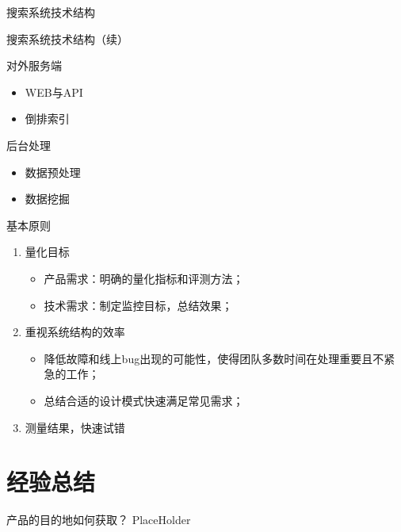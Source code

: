 \documentclass{beamer}
\begin{document}
\begin{CJK}{UTF8}{gbsn}
\begin{frame}{搜索系统技术结构}
\end{frame}

\begin{frame}{搜索系统技术结构（续）}
  \begin{block}{对外服务端}
    \begin{itemize}
    \item { WEB与API }
    \item { 倒排索引 }
    \end{itemize}
  \end{block}
  \begin{block}{后台处理}
    \begin{itemize}
    \item { 数据预处理 }
    \item { 数据挖掘 }
    \end{itemize}
  \end{block}
\end{frame}

\begin{frame}{基本原则}
  \begin{enumerate}
  \item {
    量化目标
    \begin{itemize}
    \item<2-> { 产品需求：明确的量化指标和评测方法； }
    \item<2-> { 技术需求：制定监控目标，总结效果； }
    \end{itemize}
  }
  \item {
    重视系统结构的效率
    \begin{itemize}
    \item<3-> { 降低故障和线上bug出现的可能性，使得团队多数时间在处理重要且不紧急的工作； }
    \item<3-> { 总结合适的设计模式快速满足常见需求； }
    \end{itemize}
  }
  \item {
    测量结果，快速试错
  }
  \end{enumerate}
\end{frame}



\section{经验总结}

\begin{frame}{产品的目的地如何获取？}
  PlaceHolder
\end{frame}


\end{CJK}
\end{document}
